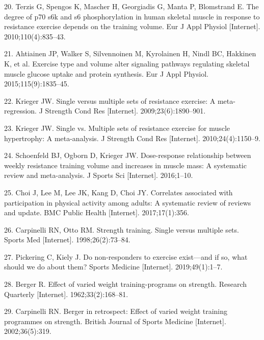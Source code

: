 \documentclass[twoside,10pt]{gihclass} %
\begin{document}
\leavevmode\hypertarget{ref-RN784}{}%
20. Terzis G, Spengos K, Mascher H, Georgiadis G, Manta P, Blomstrand E. The degree of p70 s6k and s6 phosphorylation in human skeletal muscle in response to resistance exercise depends on the training volume. Eur J Appl Physiol {[}Internet{]}. 2010;110(4):835--43.

\leavevmode\hypertarget{ref-RN1837}{}%
21. Ahtiainen JP, Walker S, Silvennoinen M, Kyrolainen H, Nindl BC, Hakkinen K, et al. Exercise type and volume alter signaling pathways regulating skeletal muscle glucose uptake and protein synthesis. Eur J Appl Physiol. 2015;115(9):1835--45.

\leavevmode\hypertarget{ref-RN793}{}%
22. Krieger JW. Single versus multiple sets of resistance exercise: A meta-regression. J Strength Cond Res {[}Internet{]}. 2009;23(6):1890--901.

\leavevmode\hypertarget{ref-RN789}{}%
23. Krieger JW. Single vs. Multiple sets of resistance exercise for muscle hypertrophy: A meta-analysis. J Strength Cond Res {[}Internet{]}. 2010;24(4):1150--9.

\leavevmode\hypertarget{ref-RN1767}{}%
24. Schoenfeld BJ, Ogborn D, Krieger JW. Dose-response relationship between weekly resistance training volume and increases in muscle mass: A systematic review and meta-analysis. J Sports Sci {[}Internet{]}. 2016;1--10.

\leavevmode\hypertarget{ref-RN2063}{}%
25. Choi J, Lee M, Lee JK, Kang D, Choi JY. Correlates associated with participation in physical activity among adults: A systematic review of reviews and update. BMC Public Health {[}Internet{]}. 2017;17(1):356.

\leavevmode\hypertarget{ref-RN794}{}%
26. Carpinelli RN, Otto RM. Strength training. Single versus multiple sets. Sports Med {[}Internet{]}. 1998;26(2):73--84.

\leavevmode\hypertarget{ref-RN2547}{}%
27. Pickering C, Kiely J. Do non-responders to exercise exist---and if so, what should we do about them? Sports Medicine {[}Internet{]}. 2019;49(1):1--7.

\leavevmode\hypertarget{ref-RN1476}{}%
28. Berger R. Effect of varied weight training-programs on strength. Research Quarterly {[}Internet{]}. 1962;33(2):168--81.

\leavevmode\hypertarget{ref-RN2568}{}%
29. Carpinelli RN. Berger in retrospect: Effect of varied weight training programmes on strength. British Journal of Sports Medicine {[}Internet{]}. 2002;36(5):319.
\end{document}
